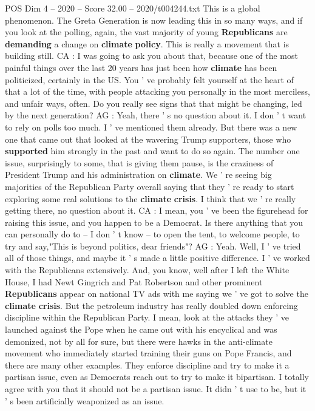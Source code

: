 \begin{textsample}{POS Dim 4 – 2020 – Score 32.00 – 2020/t004244.txt}
This is a global phenomenon.
The Greta Generation is now leading this in so many ways, and if you look at the polling, again, the vast majority of young \textbf{Republicans} are \textbf{demanding} a change on \textbf{climate} \textbf{policy}.
This is really a movement that is building still.
CA : I was going to ask you about that, because one of the most painful things over the last 20 years has just been how \textbf{climate} has been politicized, certainly in the US.
You ' ve probably felt yourself at the heart of that a lot of the time, with people attacking you personally in the most merciless, and unfair ways, often.
Do you really see signs that that might be changing, led by the next generation?
AG : Yeah, there ' s no question about it.
I don ' t want to rely on polls too much.
I ' ve mentioned them already.
But there was a new one that came out that looked at the wavering Trump supporters, those who \textbf{supported} him strongly in the past and want to do so again.
The number one issue, surprisingly to some, that is giving them pause, is the craziness of President Trump and his administration on \textbf{climate}.
We ' re seeing big majorities of the Republican Party overall saying that they ' re ready to start exploring some real solutions to the \textbf{climate} \textbf{crisis}.
I think that we ' re really getting there, no question about it.
CA : I mean, you ' ve been the figurehead for raising this issue, and you happen to be a Democrat.
Is there anything that you can personally do to -- I don ' t know -- to open the tent, to welcome people, to try and say,"This is beyond politics, dear friends"?
AG : Yeah.
Well, I ' ve tried all of those things, and maybe it ' s made a little positive difference.
I ' ve worked with the Republicans extensively.
And, you know, well after I left the White House, I had Newt Gingrich and Pat Robertson and other prominent \textbf{Republicans} appear on national TV ads with me saying we ' ve got to solve the \textbf{climate} \textbf{crisis}.
But the petroleum industry has really doubled down enforcing discipline within the Republican Party.
I mean, look at the attacks they ' ve launched against the Pope when he came out with his encyclical and was demonized, not by all for sure, but there were hawks in the anti-climate movement who immediately started training their guns on Pope Francis, and there are many other examples.
They enforce discipline and try to make it a partisan issue, even as Democrats reach out to try to make it bipartisan.
I totally agree with you that it should not be a partisan issue.
It didn ' t use to be, but it ' s been artificially weaponized as an issue.

\end{textsample}
